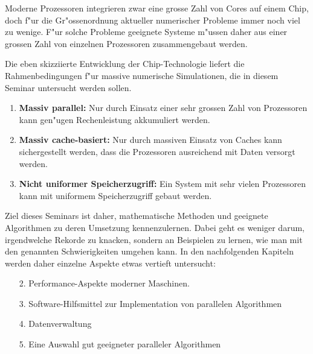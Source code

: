 Moderne Prozessoren integrieren zwar eine grosse Zahl von Cores auf
einem Chip, doch f"ur die Gr"ossenordnung aktueller numerischer
Probleme immer noch viel zu wenige. F"ur solche Probleme geeignete
Systeme m"ussen daher aus einer grossen Zahl von einzelnen Prozessoren
zusammengebaut werden. 

Die eben skizziierte Entwicklung der Chip-Technologie liefert die
Rahmenbedingungen f"ur massive numerische Simulationen, die in diesem
Seminar untersucht werden sollen.
\begin{enumerate}
\item {\bf Massiv parallel:} Nur durch Einsatz einer sehr grossen Zahl
von Prozessoren kann gen"ugen Rechenleistung akkumuliert werden.
\item {\bf Massiv cache-basiert:} Nur durch massiven Einsatz von
Caches kann sichergestellt werden, dass die Prozessoren ausreichend
mit Daten versorgt werden.
\item {\bf Nicht uniformer Speicherzugriff:} Ein System mit
sehr vielen Prozessoren kann mit uniformem Speicherzugriff gebaut
werden.
\end{enumerate}
Ziel dieses Seminars ist daher, mathematische Methoden und geeignete
Algorithmen zu deren Umsetzung kennenzulernen. Dabei geht es weniger
darum, irgendwelche Rekorde zu knacken, sondern an Beispielen zu
lernen, wie man mit den genannten Schwierigkeiten umgehen kann.
In den nachfolgenden Kapiteln werden daher einzelne Aspekte etwas
vertieft untersucht:
\begin{enumerate}
\item[2.] Performance-Aspekte moderner Maschinen.
\item[3.] Software-Hilfsmittel zur Implementation von parallelen Algorithmen
\item[4.] Datenverwaltung
\item[5.] Eine Auswahl gut geeigneter paralleler Algorithmen
\end{enumerate}
